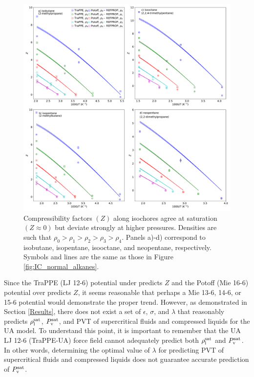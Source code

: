 \documentclass[journal=jctc,manuscript=article]{achemso}
\begin{document}
\begin{figure}[htb!]
	\centering
	\includegraphics[width=6.4in]{IC_branched_alkanes_TraPPE_Potoff}
	\caption{Compressibility factors $(Z)$ along isochores agree at saturation $(Z \approx 0)$ but deviate strongly at higher pressures. Densities are such that $\rho_0 > \rho_1 > \rho_2 > \rho_3 > \rho_4$.  Panels a)-d) correspond to isobutane, isopentane, isooctane, and neopentane, respectively. Symbols and lines are the same as those in Figure \ref{fig:IC_normal_alkanes}.}
	\label{fig:IC_branched_alkanes}
\end{figure}

Since the TraPPE (LJ 12-6) potential under predicts $Z$ and the Potoff (Mie 16-6) potential over predicts $Z$, it seems reasonable that perhaps a Mie 13-6, 14-6, or 15-6 potential would demonstrate the proper trend. However, as demonstrated in Section \ref{Results}, there does not exist a set of $\epsilon$, $\sigma$, and $\lambda$ that reasonably predicts $\rho_{\rm l}^{\rm sat}$, $P_{\rm v}^{\rm sat}$, and PVT of supercritical fluids and compressed liquids for the UA model. To understand this point, it is important to remember that the UA LJ 12-6 (TraPPE-UA) force field cannot adequately predict both $\rho_{\rm l}^{\rm sat}$ and $P_{\rm v}^{\rm sat}$. In other words, determining the optimal value of $\lambda$ for predicting PVT of supercritical fluids and compressed liquids does not guarantee accurate prediction of $P_{\rm v}^{\rm sat}$.
\end{document}
